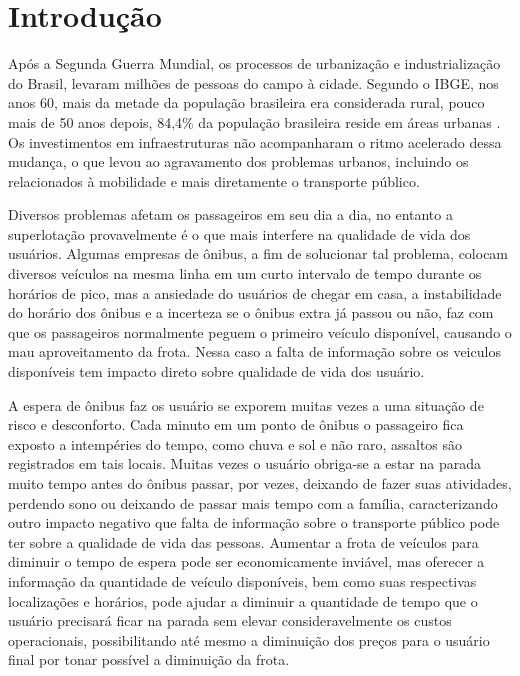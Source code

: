 \chapter{Introdução}

Após a Segunda Guerra Mundial, os processos de urbanização e industrialização do Brasil, levaram milhões de pessoas do campo à cidade. 
Segundo o IBGE, nos anos 60, mais da metade da população brasileira era considerada rural, pouco mais de 50 anos depois, 84,4\% da população 
brasileira reside em áreas urbanas \cite{golan2015crowdfunding}. Os investimentos em infraestruturas não acompanharam o ritmo acelerado dessa mudança,
o que levou ao agravamento dos problemas urbanos, incluindo os relacionados à mobilidade e mais diretamente o transporte público. 

Diversos problemas afetam os passageiros em seu dia a dia, no entanto a superlotação provavelmente é o que mais interfere na qualidade de vida dos usuários. 
Algumas empresas de ônibus, a fim de solucionar tal problema, colocam diversos veículos na mesma linha em um curto intervalo de tempo durante os horários de pico, 
mas a ansiedade do usuários de chegar em casa, a instabilidade do horário dos ônibus e a incerteza se o ônibus extra já passou ou não, faz com que os passageiros normalmente 
peguem o primeiro veículo disponível, causando o mau aproveitamento da frota. Nessa caso a falta de informação sobre os veiculos disponíveis tem impacto 
direto sobre qualidade de vida dos usuário.


A espera de ônibus faz os usuário se exporem muitas vezes a uma situação de risco e desconforto. Cada minuto em um ponto de ônibus o passageiro fica exposto a 
intempéries do tempo, como chuva e sol e não raro, assaltos são registrados em tais locais. Muitas vezes o usuário obriga-se a estar na parada muito tempo antes do ônibus passar, 
por vezes, deixando de fazer suas atividades, perdendo sono ou deixando de passar mais tempo com a família, caracterizando outro impacto negativo que falta de informação sobre o
transporte público pode ter sobre a qualidade de vida das pessoas. Aumentar a frota de veículos para diminuir o tempo de espera pode ser economicamente inviável, 
mas oferecer a informação da quantidade de veículo disponíveis, bem como suas respectivas localizações e horários, pode ajudar a diminuir a quantidade de tempo que o usuário precisará 
ficar na parada sem elevar consideravelmente os custos operacionais, possibilitando até mesmo a diminuição dos preços  para o usuário final por tonar possível a diminuição da frota. 

